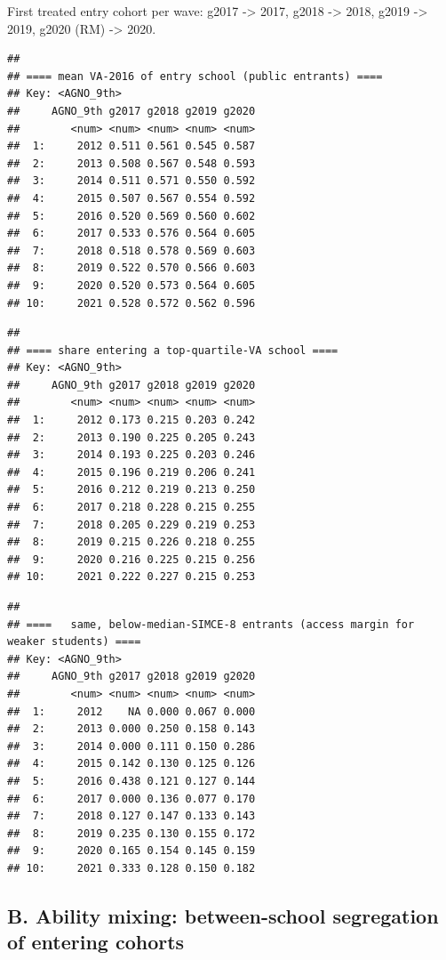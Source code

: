 \documentclass[
]{article}
\begin{document}
First treated entry cohort per wave: g2017 -\textgreater{} 2017, g2018
-\textgreater{} 2018, g2019 -\textgreater{} 2019, g2020 (RM)
-\textgreater{} 2020.

\begin{verbatim}
## 
## ==== mean VA-2016 of entry school (public entrants) ====
## Key: <AGNO_9th>
##     AGNO_9th g2017 g2018 g2019 g2020
##        <num> <num> <num> <num> <num>
##  1:     2012 0.511 0.561 0.545 0.587
##  2:     2013 0.508 0.567 0.548 0.593
##  3:     2014 0.511 0.571 0.550 0.592
##  4:     2015 0.507 0.567 0.554 0.592
##  5:     2016 0.520 0.569 0.560 0.602
##  6:     2017 0.533 0.576 0.564 0.605
##  7:     2018 0.518 0.578 0.569 0.603
##  8:     2019 0.522 0.570 0.566 0.603
##  9:     2020 0.520 0.573 0.564 0.605
## 10:     2021 0.528 0.572 0.562 0.596
\end{verbatim}

\begin{verbatim}
## 
## ==== share entering a top-quartile-VA school ====
## Key: <AGNO_9th>
##     AGNO_9th g2017 g2018 g2019 g2020
##        <num> <num> <num> <num> <num>
##  1:     2012 0.173 0.215 0.203 0.242
##  2:     2013 0.190 0.225 0.205 0.243
##  3:     2014 0.193 0.225 0.203 0.246
##  4:     2015 0.196 0.219 0.206 0.241
##  5:     2016 0.212 0.219 0.213 0.250
##  6:     2017 0.218 0.228 0.215 0.255
##  7:     2018 0.205 0.229 0.219 0.253
##  8:     2019 0.215 0.226 0.218 0.255
##  9:     2020 0.216 0.225 0.215 0.256
## 10:     2021 0.222 0.227 0.215 0.253
\end{verbatim}

\begin{verbatim}
## 
## ====   same, below-median-SIMCE-8 entrants (access margin for weaker students) ====
## Key: <AGNO_9th>
##     AGNO_9th g2017 g2018 g2019 g2020
##        <num> <num> <num> <num> <num>
##  1:     2012    NA 0.000 0.067 0.000
##  2:     2013 0.000 0.250 0.158 0.143
##  3:     2014 0.000 0.111 0.150 0.286
##  4:     2015 0.142 0.130 0.125 0.126
##  5:     2016 0.438 0.121 0.127 0.144
##  6:     2017 0.000 0.136 0.077 0.170
##  7:     2018 0.127 0.147 0.133 0.143
##  8:     2019 0.235 0.130 0.155 0.172
##  9:     2020 0.165 0.154 0.145 0.159
## 10:     2021 0.333 0.128 0.150 0.182
\end{verbatim}

\hypertarget{b.-ability-mixing-between-school-segregation-of-entering-cohorts}{%
\subsection{B. Ability mixing: between-school segregation of entering
cohorts}\label{b.-ability-mixing-between-school-segregation-of-entering-cohorts}}
\end{document}
